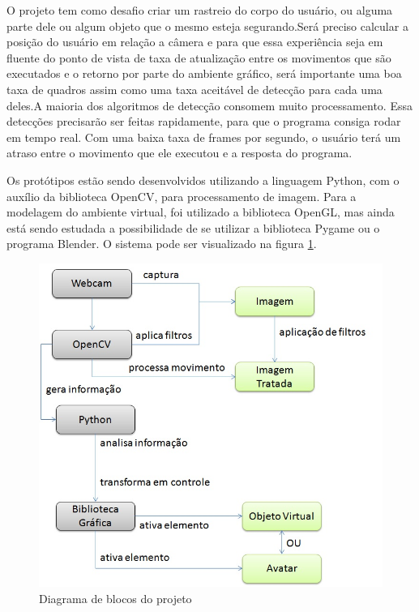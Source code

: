 O projeto tem como desafio criar um rastreio do corpo  do usuário, ou alguma parte dele
ou algum objeto que o mesmo esteja segurando.Será preciso calcular a posição do usuário
em relação a câmera e para que essa experiência seja em fluente do
ponto de vista de taxa de atualização entre os movimentos que são executados e o retorno
por parte do ambiente gráfico, será importante uma boa taxa de quadros assim como
uma taxa aceitável de detecção para cada uma deles.A maioria dos algoritmos de
detecção consomem muito processamento. Essa detecções precisarão ser feitas
rapidamente, para que o programa consiga rodar em tempo real. Com uma baixa
taxa de frames por segundo, o usuário terá um atraso entre o movimento que ele executou
e a resposta do programa.

Os protótipos estão sendo desenvolvidos utilizando a linguagem Python, com o
auxílio da biblioteca OpenCV, para processamento de imagem. Para a modelagem
do ambiente virtual, foi utilizado a biblioteca OpenGL, mas ainda está sendo
estudada a possibilidade de se utilizar a biblioteca Pygame ou o programa Blender.
O sistema pode ser visualizado na figura \ref{Diagrama}.

\begin{figure}[h]
    \center
    \includegraphics[scale=0.50]{imagens/Diagrama.jpg}

    \caption{Diagrama de blocos do projeto}
    \label{Diagrama}
\end{figure}

